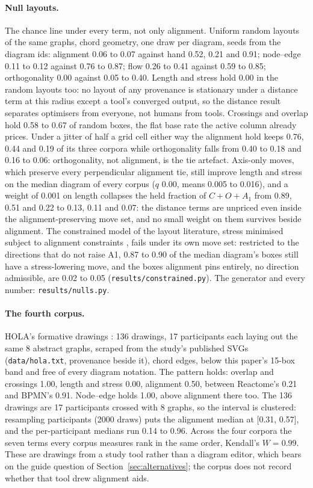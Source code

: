 \documentclass[11pt]{article}
\begin{document}
\paragraph{Null layouts.} The chance line under every term, not only
alignment. Uniform random layouts of the same graphs, chord geometry, one draw per
diagram, seeds from the diagram ids: alignment 0.06 to 0.07 against hand 0.52, 0.21 and
0.91; node--edge 0.11 to 0.12 against 0.76 to 0.87; flow 0.26 to 0.41 against 0.59 to
0.85; orthogonality 0.00 against 0.05 to 0.40. Length and stress hold 0.00 in the random
layouts too: no layout of any provenance is stationary under a distance term at this
radius except a tool's converged output, so the distance result separates optimisers from
everyone, not humans from tools. Crossings and overlap hold 0.58 to 0.67 of random boxes,
the flat base rate the active column already prices. Under a jitter of half a grid cell either way the
alignment hold keeps 0.76, 0.44 and 0.19 of its three corpora while orthogonality falls
from 0.40 to 0.18 and 0.16 to 0.06: orthogonality, not alignment, is the tie artefact.
Axis-only moves, which preserve every perpendicular alignment tie, still improve length
and stress on the median diagram of every corpus ($q$ 0.00, means 0.005 to 0.016), and a
weight of 0.001 on length collapses the held fraction of $C{+}O{+}A_1$ from 0.89, 0.51
and 0.22 to 0.13, 0.11 and 0.07: the distance terms are unpriced even inside the
alignment-preserving move set, and no small weight on them survives beside alignment. The
constrained model of the layout literature, stress minimised subject to alignment
constraints \cite{ipsepcola06, dunnart08, setcola18}, fails under its own move set:
restricted to the directions that do not raise A1, 0.87 to 0.90 of the median diagram's
boxes still have a stress-lowering move, and the boxes alignment pins entirely, no
direction admissible, are 0.02 to 0.05 (\texttt{results/constrained.py}). The
generator and every number: \texttt{results/nulls.py}.

\paragraph{The fourth corpus.} HOLA's formative
drawings \cite{hola16}: 136
drawings, 17 participants each laying out the same 8 abstract graphs, scraped from the
study's published SVGs (\texttt{data/hola.txt}, provenance beside it), chord edges,
below this paper's 15-box band and free of every diagram notation. The pattern holds:
overlap and crossings 1.00, length and stress 0.00, alignment 0.50, between Reactome's
0.21 and BPMN's 0.91. Node--edge holds 1.00, above alignment there too. The 136 drawings are
17 participants crossed with 8 graphs, so the interval is clustered: resampling
participants (2000 draws) puts the alignment median at [0.31, 0.57], and the
per-participant medians run 0.14 to 0.96. Across the four corpora the seven terms every
corpus measures rank in the same order, Kendall's $W = 0.99$. These are drawings
from a study tool rather than a diagram editor, which bears on the guide question of
Section~\ref{sec:alternatives}; the corpus does not record whether that tool drew
alignment aids.
\end{document}
